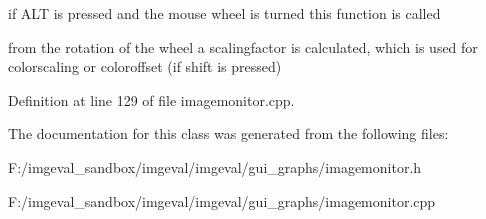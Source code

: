if ALT is pressed and the mouse wheel is turned this function is called 

from the rotation of the wheel a scalingfactor is calculated, which is used for colorscaling or coloroffset (if shift is pressed) 

Definition at line 129 of file imagemonitor.cpp.



The documentation for this class was generated from the following files:\begin{DoxyCompactItemize}
\item 
F:/imgeval\_\-sandbox/imgeval/imgeval/gui\_\-graphs/imagemonitor.h\item 
F:/imgeval\_\-sandbox/imgeval/imgeval/gui\_\-graphs/imagemonitor.cpp\end{DoxyCompactItemize}
